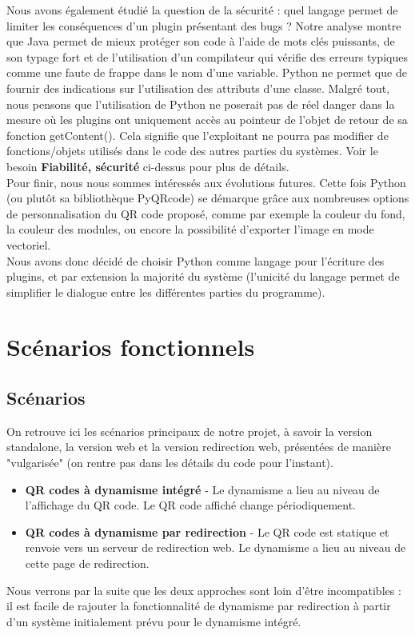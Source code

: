 \documentclass[a4paper,12pt]{article}
\begin{document}
\begin{itemize}
  Nous avons également étudié la question de la sécurité : quel langage permet de limiter les conséquences d'un plugin présentant des bugs ? Notre analyse montre que Java permet de mieux protéger son code à l'aide de mots clés puissants, de son typage fort et de l'utilisation d'un compilateur qui vérifie des erreurs typiques comme une faute de frappe dans le nom d'une variable. Python ne permet que de fournir des indications sur l'utilisation des attributs d'une classe. Malgré tout, nous pensons que l'utilisation de Python ne poserait pas de réel danger dans la mesure où les plugins ont uniquement accès au pointeur de l'objet de retour de sa fonction getContent(). Cela signifie que l'exploitant ne pourra pas modifier de fonctions/objets utilisés dans le code des autres parties du systèmes. Voir le besoin \textbf{Fiabilité, sécurité} ci-dessus pour plus de détails.\\
  \newpage
  Pour finir, nous nous sommes intéressés aux évolutions futures. Cette fois Python (ou plutôt sa bibliothèque PyQRcode) se démarque grâce aux nombreuses options de personnalisation du QR code proposé, comme par exemple la couleur du fond, la couleur des modules, ou encore la possibilité d'exporter l'image en mode vectoriel.\\
  
  Nous avons donc décidé de choisir Python comme langage pour l'écriture des plugins, et par extension la majorité du système (l'unicité du langage permet de simplifier le dialogue entre les différentes parties du programme).\\
  
\end{itemize}

\section{Scénarios fonctionnels}
\label{architecture}
\subsection{Scénarios}
\label{scenario}
\noindent On retrouve ici les scénarios principaux de notre projet, à savoir la version standalone, la version web et la version redirection web, présentées de manière "vulgarisée" (on rentre pas dans les détails du code pour l'instant).\\

\begin{itemize}
  \item \textbf{QR codes à dynamisme intégré} - Le dynamisme a lieu au niveau de l’affichage du QR code. Le QR code affiché change périodiquement.\\
  \item \textbf{QR codes à dynamisme par redirection} - Le QR code est statique et renvoie vers un serveur de redirection web. Le dynamisme a lieu au niveau de cette page de redirection.\\
\end{itemize}
\noindent
Nous verrons par la suite que les deux approches sont loin d'être incompatibles : il est facile de rajouter la fonctionnalité de dynamisme par redirection à partir d'un système initialement prévu pour le dynamisme intégré.
\end{document}

